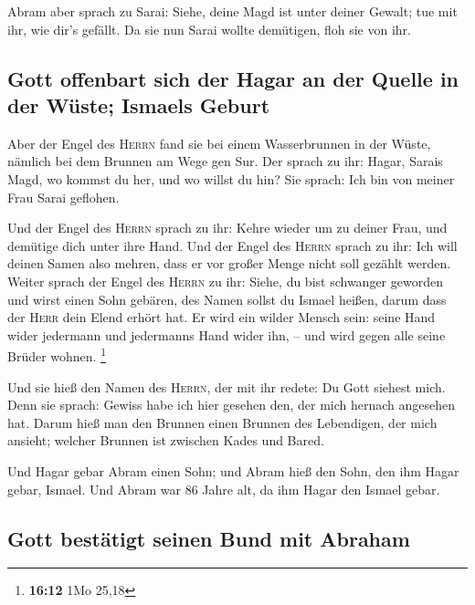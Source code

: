  Abram aber sprach zu Sarai: Siehe, deine Magd ist unter
deiner Gewalt; tue mit ihr, wie dir's gefällt. Da sie nun Sarai wollte
demütigen, floh sie von ihr.

\hypertarget{gott-offenbart-sich-der-hagar-an-der-quelle-in-der-wuxfcste-ismaels-geburt}{%
\subsection{Gott offenbart sich der Hagar an der Quelle in der Wüste;
Ismaels
Geburt}\label{gott-offenbart-sich-der-hagar-an-der-quelle-in-der-wuxfcste-ismaels-geburt}}

 Aber der Engel des \textsc{Herrn} fand sie bei einem
Wasserbrunnen in der Wüste, nämlich bei dem Brunnen am Wege gen Sur.
 Der sprach zu ihr: Hagar, Sarais Magd, wo kommst du her,
und wo willst du hin? Sie sprach: Ich bin von meiner Frau Sarai
geflohen.

 Und der Engel des \textsc{Herrn} sprach zu ihr: Kehre
wieder um zu deiner Frau, und demütige dich unter ihre Hand.
 Und der Engel des \textsc{Herrn} sprach zu ihr: Ich will
deinen Samen also mehren, dass er vor großer Menge nicht soll gezählt
werden.  Weiter sprach der Engel des \textsc{Herrn} zu
ihr: Siehe, du bist schwanger geworden und wirst einen Sohn gebären, des
Namen sollst du Ismael heißen, darum dass der \textsc{Herr} dein Elend
erhört hat.  Er wird ein wilder Mensch sein: seine Hand
wider jedermann und jedermanns Hand wider ihn, -- und wird gegen alle
seine Brüder wohnen. \footnote{\textbf{16:12} 1Mo 25,18}

 Und sie hieß den Namen des \textsc{Herrn}, der mit ihr
redete: Du Gott siehest mich. Denn sie sprach: Gewiss habe ich hier
gesehen den, der mich hernach angesehen hat.  Darum hieß
man den Brunnen einen Brunnen des Lebendigen, der mich ansieht; welcher
Brunnen ist zwischen Kades und Bared.

 Und Hagar gebar Abram einen Sohn; und Abram hieß den
Sohn, den ihm Hagar gebar, Ismael.  Und Abram war 86
Jahre alt, da ihm Hagar den Ismael gebar.

\hypertarget{gott-bestuxe4tigt-seinen-bund-mit-abraham}{%
\subsection{Gott bestätigt seinen Bund mit
Abraham}\label{gott-bestuxe4tigt-seinen-bund-mit-abraham}}

